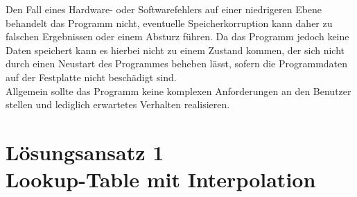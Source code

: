 \documentclass{article}
\begin{document}
			Den Fall eines Hardware- oder Softwarefehlers auf einer niedrigeren Ebene behandelt das Programm nicht, eventuelle Speicherkorruption kann daher zu falschen Ergebnissen oder einem Absturz führen. Da das Programm jedoch keine Daten speichert kann es hierbei nicht zu einem Zustand kommen, der sich nicht durch einen Neustart des Programmes beheben lässt, sofern die Programmdaten auf der Festplatte nicht beschädigt sind.\\
			Allgemein sollte das Programm keine komplexen Anforderungen an den Benutzer stellen und lediglich erwartetes Verhalten realisieren.

\iffalse
\section{Allgemeine Überlegungen}
	Das Assemblerprogramm wird mit allen benötigten Ressourcen zum Kompilieren und Ausführen ausgeliefert. Dazu gehört ein Rahmenprogramm in C, welches eine Eingabe über die Konsole aufnimmt und anschließend das Ergebnis in dieser zurückgibt. Hierbei wird eine Liste von floating-point Werten gefolgt von einem \codeword{\n} über \codeword{stdin} erwartet, oder aber eine Liste von Werten als Argumente für das Programm auf der Kommandozeile. Die Ausgabe des Programms besteht aus dem Eingabewert, gefolgt von einem Doppelpunkt und dem respektiven Arcsinus des Eingabewertes. Um die Laufzeit zu verbessern besteht die Möglichkeit, mehrere Berechnungen hintereinander auszuführen, ohne das Programm neu starten zu müssen.\\
	Die Ergebnisse des Programmes müssen ausreichend präzise, also auf mehrere Nachkommastellen genau sein. Um jedoch zu langer Laufzeit vorzubeugen wird ein Kompromiss zwischen Präzision und aufgewendeter Zeit gefunden werden müssen. Hierbei gehen wir davon aus, dass das Ergebnis nicht für wissenschaftliche Zwecke genutzt wird, der Benutzer also eher ein schnelles Ergebnis erwartet und durchschnittlich viele Ressourcen zur Berechnung dieses zur Verfügung stellt.
\fi

\section{Lösungsansatz 1 \\ Lookup-Table mit Interpolation}
\end{document}
